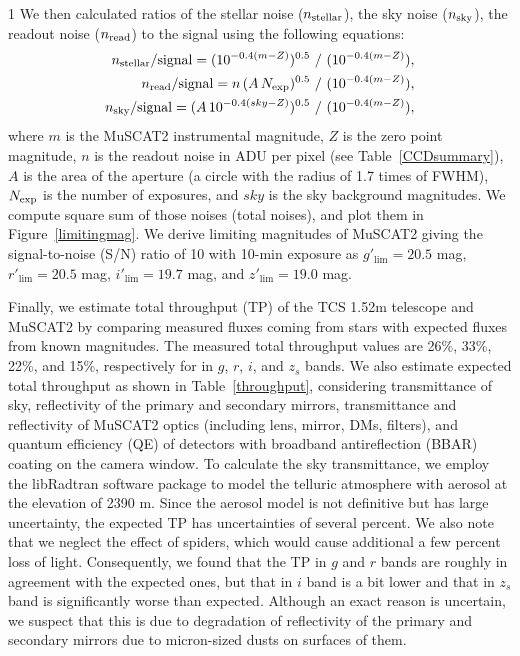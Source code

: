 \documentclass[a4paper,12pt]{spieman}  %
\begin{document}
\begin{spacing}{1}
We then calculated ratios of the stellar noise ($n_{\rm stellar}$), the sky noise ($n_{\rm sky}$),
the readout noise ($n_{\rm read}$) to the signal using the following equations:
\begin{eqnarray}
n_{\rm stellar} / {\rm signal} = (10^{-0.4(m-Z)})^{0.5} \,\, / \,\, (10^{-0.4(m-Z)}),\\
n_{\rm read} / {\rm signal} = {n \, (A \, N_{\rm exp})^{0.5}} \,\, / \,\, (10^{-0.4(m-Z)}),\\
n_{\rm sky} / {\rm signal} = (A\,10^{-0.4(sky-Z)})^{0.5} \,\, / \,\, (10^{-0.4(m-Z)}),
\end{eqnarray}
where $m$ is the MuSCAT2 instrumental magnitude,
$Z$ is the zero point magnitude,
$n$ is the readout noise in ADU per pixel (see Table~\ref{CCDsummary}),
$A$ is the area of the aperture (a circle with the radius of 1.7 times of FWHM),
$N_{\rm exp}$ is the number of exposures, and
$sky$ is the sky background magnitudes.
We compute square sum of those noises (total noises), and plot them in Figure~\ref{limitingmag}.
We derive limiting magnitudes of MuSCAT2 giving the signal-to-noise (S/N) ratio of 10
with 10-min exposure as
$g'_\mathrm{lim} = 20.5$ mag, $r'_\mathrm{lim} = 20.5$ mag,
$i'_\mathrm{lim} = 19.7$ mag, and $z'_{\mathrm{lim}} = 19.0$ mag.

Finally, we estimate total throughput (TP) of the TCS 1.52m telescope and MuSCAT2 by
comparing measured fluxes coming from stars with expected fluxes from known magnitudes.
The measured total throughput values are 
26\%,  33\%,  22\%, and 15\%, respectively for in $g$, $r$, $i$, and $z_{s}$ bands.
We also estimate expected total throughput as shown in Table~\ref{throughput},
considering transmittance of sky, reflectivity of the primary and secondary mirrors,
transmittance and reflectivity of MuSCAT2 optics (including lens, mirror, DMs, filters),
and quantum efficiency (QE) of detectors with broadband antireflection (BBAR) coating on the camera window.
To calculate the sky transmittance, we employ the libRadtran software
package\cite{2005ACP.....5.1855M} to model the telluric atmosphere with aerosol
at the elevation of 2390 m.
Since the aerosol model is not definitive but has large uncertainty,
the expected TP has uncertainties of several percent.
We also note that we neglect the effect of spiders, which would cause additional a few percent loss of light. 
Consequently, we found that the TP in $g$ and $r$ bands are roughly in agreement with the expected ones,
but that in $i$ band is a bit lower and that in $z_{s}$ band is significantly worse than expected.
Although an exact reason is uncertain, we suspect that this is due to degradation of reflectivity of
the primary and secondary mirrors due to micron-sized dusts on surfaces of them.


\end{spacing}
\end{document}
